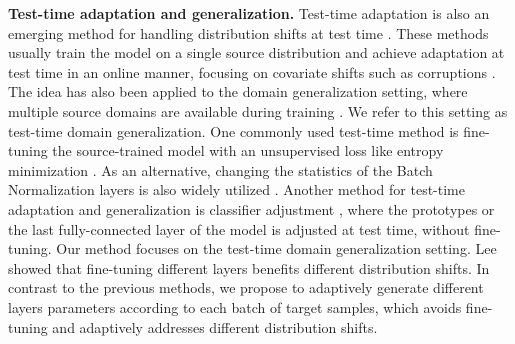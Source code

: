 \noindent
\textbf{Test-time adaptation and generalization.}
Test-time adaptation is also an emerging method for handling distribution shifts at test time \cite{sun2020test, wang2021tent, liu2021ttt++, gao2022back, niu2023towards, sun2022dynamic, liu2024cross, yi2023source, zhang2023domainadaptor}. These methods usually train the model on a single source distribution and achieve adaptation at test time in an online manner, focusing on covariate shifts such as corruptions  \cite{wang2021tent, goyal2022test, zhang2021memo, niu2022efficient}.
The idea has also been applied to the domain generalization setting, where multiple source domains are available during training  \cite{du2020metanorm, li2018learning, xiao2023energy, jang2022test, zhang2023adanpc, ambekar2024variational, ambekar2023variational_iclr}. 
We refer to this setting as test-time domain generalization.
One commonly used test-time method is fine-tuning the source-trained model with an unsupervised loss like entropy minimization \cite{wang2021tent, zhang2021memo, zhou2021bayesian, goyal2022test, zhang2023domainadaptor,niu2022efficient}. As an alternative, changing the statistics of the Batch Normalization layers is also widely utilized \cite{schneider2020improving, du2020metanorm, you2021test, hu2021mixnorm, gong2022note,lim2023ttn}.
Another method for test-time adaptation and generalization is classifier adjustment \cite{iwasawa2021test, xiao2022learning, zhang2023adanpc}, where the prototypes or the last fully-connected layer of the model is adjusted at test time, without fine-tuning.
Our method focuses on the test-time domain generalization setting.
Lee \etal \cite{lee2022surgical} showed that fine-tuning different layers benefits different distribution shifts.
In contrast to the previous methods, we propose to adaptively generate different layers parameters according to each batch of target samples, which avoids fine-tuning and adaptively addresses different distribution shifts.

